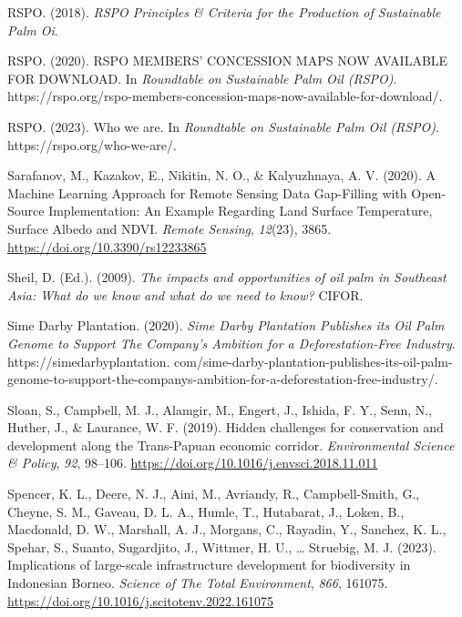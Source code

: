 \documentclass[
  letterpaper,
  DIV=11,
  numbers=noendperiod]{scrreprt}
\newlength{\cslhangindent}
\newlength{\cslentryspacingunit} %
\newenvironment{CSLReferences}[2] %
 {%
  \setlength{\parindent}{0pt}
  \ifodd #1
  \let\oldpar\par
  \def\par{\hangindent=\cslhangindent\oldpar}
  \fi
  \setlength{\parskip}{#2\cslentryspacingunit}
 }%
 {}
\begin{document}
\begin{CSLReferences}{1}{0}
\leavevmode{}%
RSPO. (2018). \emph{{RSPO Principles} \& {Criteria} for the {Production}
of {Sustainable Palm Oi}}.

\leavevmode{}%
RSPO. (2020). {RSPO MEMBERS}' {CONCESSION MAPS NOW AVAILABLE FOR
DOWNLOAD}. In \emph{Roundtable on Sustainable Palm Oil (RSPO)}.
https://rspo.org/rspo-members-concession-maps-now-available-for-download/.

\leavevmode{}%
RSPO. (2023). Who we are. In \emph{Roundtable on Sustainable Palm Oil
(RSPO)}. https://rspo.org/who-we-are/.

\leavevmode{}%
Sarafanov, M., Kazakov, E., Nikitin, N. O., \& Kalyuzhnaya, A. V.
(2020). A {Machine Learning Approach} for {Remote Sensing Data
Gap-Filling} with {Open-Source Implementation}: {An Example Regarding
Land Surface Temperature}, {Surface Albedo} and {NDVI}. \emph{Remote
Sensing}, \emph{12}(23), 3865. \url{https://doi.org/10.3390/rs12233865}

\leavevmode{}%
Sheil, D. (Ed.). (2009). \emph{The impacts and opportunities of oil palm
in {Southeast Asia}: What do we know and what do we need to know?}
{CIFOR}.

\leavevmode{}%
Sime Darby Plantation. (2020). \emph{Sime {Darby Plantation Publishes}
its {Oil Palm Genome} to {Support The Company}'s {Ambition} for a
{Deforestation-Free Industry}}. https://simedarbyplantation.
com/sime-darby-plantation-publishes-its-oil-palm-genome-to-support-the-companys-ambition-for-a-deforestation-free-industry/.

\leavevmode{}%
Sloan, S., Campbell, M. J., Alamgir, M., Engert, J., Ishida, F. Y.,
Senn, N., Huther, J., \& Laurance, W. F. (2019). Hidden challenges for
conservation and development along the {Trans-Papuan} economic corridor.
\emph{Environmental Science \& Policy}, \emph{92}, 98--106.
\url{https://doi.org/10.1016/j.envsci.2018.11.011}

\leavevmode{}%
Spencer, K. L., Deere, N. J., Aini, M., Avriandy, R., Campbell-Smith,
G., Cheyne, S. M., Gaveau, D. L. A., Humle, T., Hutabarat, J., Loken,
B., Macdonald, D. W., Marshall, A. J., Morgans, C., Rayadin, Y.,
Sanchez, K. L., Spehar, S., Suanto, Sugardjito, J., Wittmer, H. U.,
\ldots{} Struebig, M. J. (2023). Implications of large-scale
infrastructure development for biodiversity in {Indonesian Borneo}.
\emph{Science of The Total Environment}, \emph{866}, 161075.
\url{https://doi.org/10.1016/j.scitotenv.2022.161075}


\end{CSLReferences}
\end{document}
